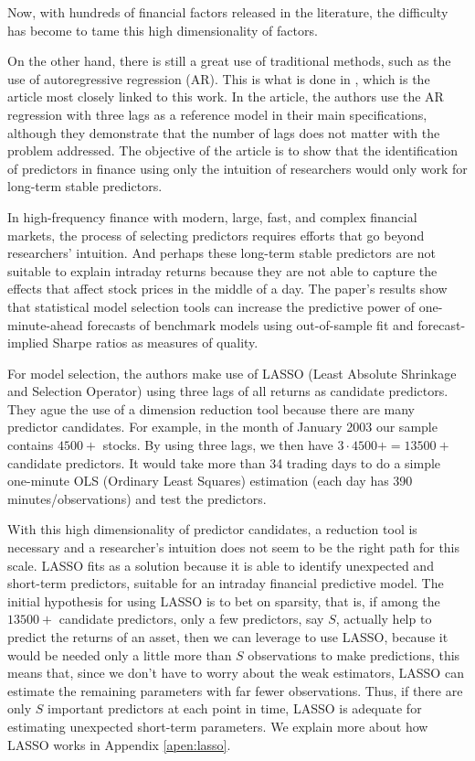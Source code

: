 Now, with hundreds of financial factors released in the literature, the difficulty has become to tame this high dimensionality of factors.

On the other hand, there is still a great use of traditional methods, such as the use of autoregressive regression (AR). This is what is done in , which is the article most closely linked to this work. In the article, the authors use the AR regression with three lags as a reference model in their main specifications, although they demonstrate that the number of lags does not matter with the problem addressed. The objective of the article is to show that the identification of predictors in finance using only the intuition of researchers would only work for long-term stable predictors.

In high-frequency finance with modern, large, fast, and complex financial markets, the process of selecting predictors requires efforts that go beyond researchers' intuition. And perhaps these long-term stable predictors are not suitable to explain intraday returns because they are not able to capture the effects that affect stock prices in the middle of a day. The paper's results show that statistical model selection tools can increase the predictive power of one-minute-ahead forecasts of benchmark models using out-of-sample fit and forecast-implied Sharpe ratios as measures of quality.

For model selection, the authors make use of LASSO (Least Absolute Shrinkage and Selection Operator) using three lags of all returns as candidate predictors. They ague the use of a dimension reduction tool because there are many predictor candidates. For example, in the month of January 2003 our sample contains $4500+$ stocks. By using three lags, we then have $3\cdot 4500+ = 13500+$ candidate predictors. It would take more than 34 trading days to do a simple one-minute OLS (Ordinary Least Squares) estimation (each day has 390 minutes/observations) and test the predictors.

With this high dimensionality of predictor candidates, a reduction tool is necessary and a researcher's intuition does not seem to be the right path for this scale. LASSO fits as a solution because it is able to identify unexpected and short-term predictors, suitable for an intraday financial predictive model. The initial hypothesis for using LASSO is to bet on sparsity, that is, if among the $13500+$ candidate predictors, only a few predictors, say $S$, actually help to predict the returns of an asset, then we can leverage to use LASSO, because it would be needed only a little more than $S$ observations to make predictions, this means that, since we don't have to worry about the weak estimators, LASSO can estimate the remaining parameters with far fewer observations. Thus, if there are only $S$ important predictors at each point in time, LASSO is adequate for estimating unexpected short-term parameters. We explain more about how LASSO works in Appendix \ref{apen:lasso}.

